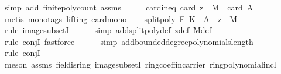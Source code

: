 \begin{isabellebody}
\ {\isacharparenleft}{\kern0pt}simp\ add{\isacharcolon}{\kern0pt}\ finite{\isacharunderscore}{\kern0pt}poly{\isacharunderscore}{\kern0pt}count\ assms{\isacharparenright}{\kern0pt}\isanewline
\ \ \isamarkupfalse%
\ \isamarkupfalse%
\ card{\isacharunderscore}{\kern0pt}ineq{\isacharunderscore}{\kern0pt}{}{\isacharcolon}{\kern0pt}\ {\isachardoublequoteopen}card\ {\isacharparenleft}{\kern0pt}{\isacharbraceleft}{\kern0pt}z{\isacharbraceright}{\kern0pt}\ {\isasymtimes}\ M{\isacharparenright}{\kern0pt}\ {\isasymle}\ card\ {\isacharquery}{\kern0pt}A{\isachardoublequoteclose}\ \isanewline
\ \ \ \ \isamarkupfalse%
\ {\isacharparenleft}{\kern0pt}metis\ {\isacharparenleft}{\kern0pt}mono{\isacharunderscore}{\kern0pt}tags{\isacharcomma}{\kern0pt}\ lifting{\isacharparenright}{\kern0pt}\ card{\isacharunderscore}{\kern0pt}mono{\isacharparenright}{\kern0pt}\isanewline
\isanewline
\ \ \isamarkupfalse%
\ {\isachardoublequoteopen}split{\isacharunderscore}{\kern0pt}poly\ F\ K\ {\isacharbackquote}{\kern0pt}\ {\isacharquery}{\kern0pt}A\ {\isasymsubseteq}\ {\isacharbraceleft}{\kern0pt}z{\isacharbraceright}{\kern0pt}\ {\isasymtimes}\ M{\isachardoublequoteclose}\isanewline
\ \ \ \ \isamarkupfalse%
\ {\isacharparenleft}{\kern0pt}rule\ image{\isacharunderscore}{\kern0pt}subsetI{\isacharparenright}{\kern0pt}\isanewline
\ \ \ \ \isamarkupfalse%
\ {\isacharparenleft}{\kern0pt}simp\ add{\isacharcolon}{\kern0pt}split{\isacharunderscore}{\kern0pt}poly{\isacharunderscore}{\kern0pt}def\ z{\isacharunderscore}{\kern0pt}def\ M{\isacharunderscore}{\kern0pt}def{\isacharparenright}{\kern0pt}\isanewline
\ \ \ \ \isamarkupfalse%
\ {\isacharparenleft}{\kern0pt}rule\ conjI{\isacharcomma}{\kern0pt}\ fastforce{\isacharparenright}{\kern0pt}\isanewline
\ \ \ \ \isamarkupfalse%
\ {\isacharparenleft}{\kern0pt}simp\ add{\isacharcolon}{\kern0pt}bounded{\isacharunderscore}{\kern0pt}degree{\isacharunderscore}{\kern0pt}polynomials{\isacharunderscore}{\kern0pt}length{\isacharparenright}{\kern0pt}\isanewline
\ \ \ \ \isamarkupfalse%
\ {\isacharparenleft}{\kern0pt}rule\ conjI{\isacharparenright}{\kern0pt}\ \isanewline
\ \ \ \ \ \isamarkupfalse%
\ {\isacharparenleft}{\kern0pt}meson\ assms{\isacharparenleft}{\kern0pt}{}{\isacharparenright}{\kern0pt}\ field{\isachardot}{\kern0pt}is{\isacharunderscore}{\kern0pt}ring\ image{\isacharunderscore}{\kern0pt}subsetI\ ring{\isachardot}{\kern0pt}coeff{\isacharunderscore}{\kern0pt}in{\isacharunderscore}{\kern0pt}carrier\ ring{\isachardot}{\kern0pt}polynomial{\isacharunderscore}{\kern0pt}incl\ \isanewline

\end{isabellebody}
